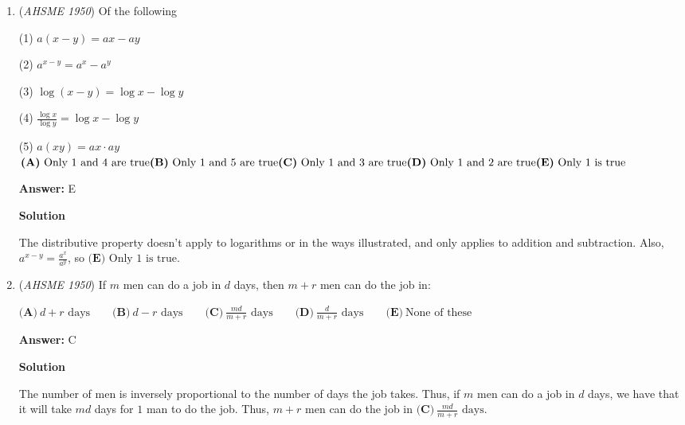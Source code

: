 \begin{enumerate}
 \textbf{Answer: }C



\textbf{Solution}

Plug in the points $(0,100)$ and $(4,0)$ into each equation. The only one that works for both points is $\mathrm{(C)}.$ Plug in the rest of the points to confirm the answer is indeed $\boxed{\mathrm{(C)}\ y=100-5x-5x^2}$.

 


	\item (\textit{AHSME 1950}) Of the following 


 (1) $a(x-y)=ax-ay$


 (2) $a^{x-y}=a^x-a^y$


 (3) $\log (x-y)=\log x-\log y$


 (4) $\frac{\log x}{\log y}=\log{x}-\log{y}$


 (5) $a(xy)=ax \cdot ay$
$\textbf{(A)}\ \text{Only 1 and 4 are true}\qquad\\\textbf{(B)}\ \text{Only 1 and 5 are true}\qquad\\\textbf{(C)}\ \text{Only 1 and 3 are true}\qquad\\\textbf{(D)}\ \text{Only 1 and 2 are true}\qquad\\\textbf{(E)}\ \text{Only 1 is true}$

 \textbf{Answer: }E



\textbf{Solution}

The distributive property doesn't apply to logarithms or in the ways illustrated, and only applies to addition and subtraction. Also, $a^{x-y} = \frac{a^x}{a^y}$, so $\boxed{\textbf{(E)} \text{ Only 1 is true}}$.

 


	\item (\textit{AHSME 1950}) If $m$ men can do a job in $d$ days, then $m+r$ men can do the job in:


 $\textbf{(A)}\ d+r\text{ days}\qquad\textbf{(B)}\ d-r\text{ days}\qquad\textbf{(C)}\ \frac{md}{m+r}\text{ days}\qquad\textbf{(D)}\ \frac{d}{m+r}\text{ days}\qquad\textbf{(E)}\ \text{None of these}$

 \textbf{Answer: }C



\textbf{Solution}

The number of men is inversely proportional to the number of days the job takes. Thus, if $m$ men can do a job in $d$ days, we have that it will take $md$ days for $1$ man to do the job. Thus, $m + r$ men can do the job in $\boxed{\textbf{(C)}\ \frac{md}{m+r}\text{ days}}$.


\end{enumerate}
